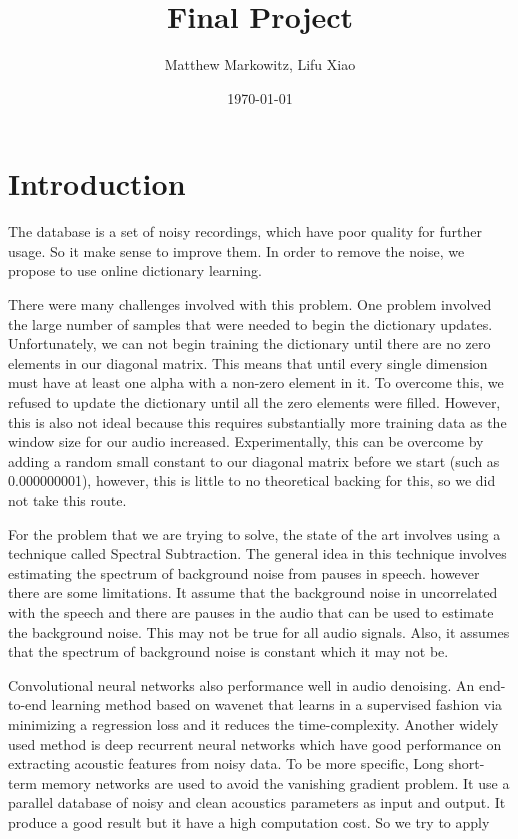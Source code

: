 \documentclass[UTF8]{article}
\title{Final Project}
\author{Matthew Markowitz, Lifu Xiao}
\date{\today}
\begin{document}
\maketitle


\section{Introduction}
The database is a set of noisy recordings\cite{valentini2017noisy}, which have poor quality for further usage.  So it make sense  to improve them. In order to remove the noise, we propose to use online dictionary learning\cite{mairal2010online}.


There were many challenges involved with this problem. One problem involved the large number of samples that were needed to begin the dictionary updates. Unfortunately, we can not begin training the dictionary until there are no zero elements in our diagonal matrix. This means that until every single dimension must have at least one alpha with a non-zero element in it. To overcome this, we refused to update the dictionary until all the zero elements were filled. However, this is also not ideal because this requires substantially more training data as the window size for our audio increased. Experimentally, this can be overcome by adding a random small constant to our diagonal matrix before we start (such as 0.000000001), however, this is little to no theoretical backing for this, so we did not take this route.


For the problem that we are trying to solve, the state of the art involves using a technique called Spectral Subtraction\cite{upadhyay2015speech}. The general idea in this technique involves estimating the spectrum of background noise from pauses in speech. however there are some limitations. It assume that the background noise in uncorrelated with the speech and there are pauses in the audio that can be used to estimate the background noise. This may not be true for all audio signals. Also, it assumes that the spectrum of background noise is constant which it may not be.


Convolutional neural networks also performance well in audio denoising. An end-to-end learning method based on wavenet\cite{rethage2018wavenet} that learns in a supervised fashion via minimizing a regression loss and it reduces the time-complexity. Another widely used method is deep recurrent neural networks\cite{valentini2016speech} which have good performance on extracting acoustic features from noisy data. To be more specific, Long short-term memory networks are used to avoid the vanishing gradient problem. It use a parallel database of noisy and clean acoustics parameters as input and output. It produce a good result but it have a high computation cost. So we try to apply 
\end{document}
